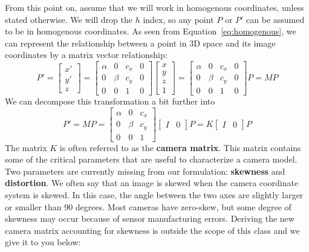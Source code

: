 \documentclass[a4paper, 12pt]{article}
\renewcommand\emph{\textbf}
\begin{document}
From this point on, assume that we will work in homogenous coordinates, unless stated otherwise. We will drop the $h$ index, so any point $P$ or $P'$ can be assumed to be in homogenous coordinates. As seen from Equation~\ref{eq:homogenous}, we can represent the relationship between a point in 3D space and its image coordinates by a matrix vector relationship:
\begin{equation}
    P' = \begin{bmatrix}x'\\y'\\ z\end{bmatrix}=\begin{bmatrix}
    \alpha & 0 & c_x & 0\\
    0 & \beta & c_y & 0 \\ 
    0 & 0 & 1 & 0
    \end{bmatrix}\begin{bmatrix}x\\y\\z\\1\end{bmatrix}=
    \begin{bmatrix}
    \alpha & 0 & c_x & 0\\
    0 & \beta & c_y & 0 \\ 
    0 & 0 & 1 & 0
    \end{bmatrix}P = MP 
    \label{eq:canonical}
\end{equation}
We can decompose this transformation a bit further into 
\begin{equation}
P' = MP = \begin{bmatrix}
    \alpha & 0 & c_x \\
    0 & \beta & c_y  \\ 
    0 & 0 & 1 
    \end{bmatrix}\begin{bmatrix}I & 0\end{bmatrix}P = K\begin{bmatrix}I & 0\end{bmatrix}P
    \label{eq:decomposedHomogenousTransform}
\end{equation}
The matrix $K$ is often referred to as the \emph{camera matrix}. This matrix contains some of the critical parameters that are useful to characterize a camera model. Two parameters are currently missing from our formulation: \emph{skewness} and \emph{distortion}. We often say that an image is skewed when the camera coordinate system is skewed. In this case, the angle between the two axes are slightly larger or smaller than 90 degrees. Most cameras have zero-skew, but some degree of skewness may occur because of sensor manufacturing errors. Deriving the new camera matrix accounting for skewness is outside the scope of this class and we give it to you below:
\end{document}
